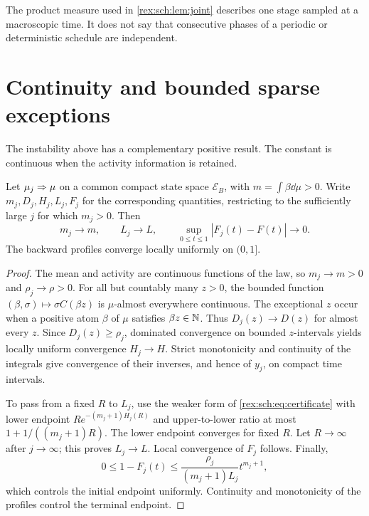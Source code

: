 The product measure used in \cref{rex:sch:lem:joint} describes one stage
sampled at a macroscopic time. It does not say that consecutive
phases of a periodic or deterministic schedule are independent.

\section{Continuity and bounded sparse exceptions}
\label{rex:sch:sec:stability}

The instability above has a complementary positive result. The
constant is continuous when the activity information is retained.

\begin{theorem}
\label{rex:sch:thm:continuity}
Let $\mu_j\mathrel{\Rightarrow}\mu$ on a common compact state space $\mathcal E_B$,
with $m=\int\beta\dd\mu>0$. Write $m_j,D_j,H_j,L_j,F_j$ for
the corresponding quantities, restricting to the sufficiently large
$j$ for which $m_j>0$. Then
\[
 m_j\to m,\qquad L_j\to L,
 \qquad \sup_{0\leq t\leq1}|F_j(t)-F(t)|\to0.
\]
The backward profiles converge locally uniformly on $(0,1]$.
\end{theorem}

\begin{proof}
The mean and activity are continuous functions of the law, so
$m_j\to m>0$ and $\rho_j\to\rho>0$. For all but countably many
$z>0$, the bounded function $(\beta,\sigma)\mapsto\sigma C(\beta z)$
is $\mu$-almost everywhere continuous. The exceptional $z$ occur
when a positive atom $\beta$ of $\mu$ satisfies $\beta z\in\mathbb N$.
Thus $D_j(z)\to D(z)$ for almost every $z$.
Since $D_j(z)\geq\rho_j$, dominated convergence on bounded
$z$-intervals yields locally uniform convergence $H_j\to H$.
Strict monotonicity and continuity of the integrals give convergence
of their inverses, and hence of $y_j$, on compact time intervals.

To pass from a fixed $R$ to $L_j$, use the weaker form of
\eqref{rex:sch:eq:certificate} with lower endpoint
$R e^{-(m_j+1)H_j(R)}$ and upper-to-lower ratio at most
$1+1/((m_j+1)R)$. The lower endpoint converges for fixed $R$.
Let $R\to\infty$ after $j\to\infty$; this proves $L_j\to L$.
Local convergence of $F_j$ follows. Finally,
\[
 0\leq1-F_j(t)\leq
 \frac{\rho_j}{(m_j+1)L_j}t^{m_j+1},
\]
which controls the initial endpoint uniformly. Continuity and
monotonicity of the profiles control the terminal endpoint.
\end{proof}

